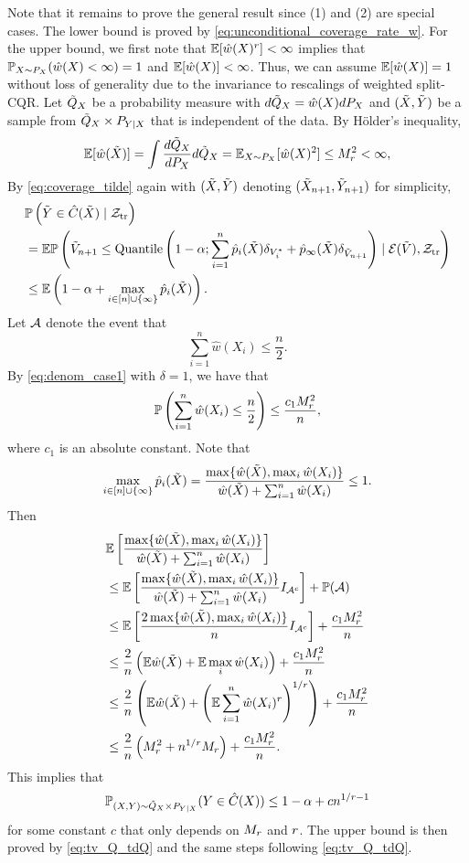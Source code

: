 Note that it remains to prove the general result since (1) and (2) are special cases. The lower bound is proved by \eqref{eq:unconditional_coverage_rate_w}. For the upper bound, we first note that $\E[\hat{w}(X)^{\r}] < \infty$ implies that $\P_{X\sim P_{X}}(\hat{w}(X) < \infty) = 1$ and $\E[\hat{w}(X)] < \infty$. Thus, we can assume $\E[\hat{w}(X)] = 1$ without loss of generality due to the invariance to rescalings of weighted split-CQR. Let $\td{Q}_{X}$ be a probability measure with $d\td{Q}_{X} = \hat{w}(X)dP_{X}$ and $(\td{X}, \td{Y})$ be a sample from $\td{Q}_{X}\times P_{Y\mid X}$ that is independent of the data. By H\"{o}lder's inequality, 
\[\E [\hat{w}(\td{X})] = \int \frac{d\td{Q}_{X}}{dP_{X}}d\td{Q}_{X} = \E_{X\sim P_{X}}[\hat{w}(X)^{2}] \le M_{\r}^2 < \infty,\]
By \eqref{eq:coverage_tilde} again with $(\td{X}, \td{Y})$ denoting $(\td{X}_{n+1}, \td{Y}_{n+1})$ for simplicity,
\begin{align*}
  &\P\lb\td{Y}\in \hat{C}(\td{X})\mid \Z_{\tr}\rb\\
  & = \E \P\lb \td{V}_{n + 1}\le \qt\lb 1 - \alpha; \sum_{i=1}^{n}\hat{p}_{i}(\td{X})\delta_{V_{i}^{*}} + \hat{p}_{\infty}(\td{X})\delta_{\td{V}_{n+1}}\rb \mid \cE(\td{V}), \Z_{\tr}\rb\nonumber\\
 & \le \E \lb 1 - \alpha + \max_{i\in [n]\cup \{\infty\}}\hat{p}_{i}(\td{X})\rb.
\end{align*}
 Let $\A$ denote the event that
 \[\sum_{i=1}^{n}\hat{w}(X_{i}) \le \frac{n}{2}.\]
 By \eqref{eq:denom_case1} with $\delta = 1$, we have that
 \[\P\lb\sum_{i=1}^{n}\hat{w}(X_i)\le \frac{n}{2}\rb \le \frac{c_{1}M_{\r}^{2}}{n},\]
 where $c_1$ is an absolute constant. Note that
 \[\max_{i\in [n]\cup \{\infty\}}\hat{p}_{i}(\td{X}) = \frac{\max\{\hat{w}(\td{X}), \max_{i}\hat{w}(X_{i})\}}{\hat{w}(\td{X}) + \sum_{i=1}^{n}\hat{w}(X_{i})}\le 1.\]
 Then
 \begin{align*}
   &\E \left[\frac{\max\{\hat{w}(\td{X}), \max_{i}\hat{w}(X_{i})\}}{\hat{w}(\td{X}) + \sum_{i=1}^{n}\hat{w}(X_{i})}\right]\\
   & \le \E\left[\frac{\max\{\hat{w}(\td{X}), \max_{i}\hat{w}(X_{i})\}}{\hat{w}(\td{X}) + \sum_{i=1}^{n}\hat{w}(X_{i})}I_{\A^{c}}\right] + \P(\A)\\
   & \le \E\left[\frac{2\max\{\hat{w}(\td{X}), \max_{i}\hat{w}(X_{i})\}}{n}I_{\A^{c}}\right] + \frac{c_{1}M_{\r}^{2}}{n}\\
   & \le \frac{2}{n}\lb \E \hat{w}(\td{X}) + \E \max_{i}\hat{w}(X_{i})\rb + \frac{c_{1}M_{\r}^{2}}{n}\\
   & \le \frac{2}{n}\lb \E \hat{w}(\td{X}) + \lb\E\sum_{i=1}^{n}\hat{w}(X_{i})^{\r}\rb^{1/\r}\rb + \frac{c_{1}M_{\r}^{2}}{n}\\
   & \le \frac{2}{n}\lb M_{\r}^{2} + n^{1 / \r}M_{\r}\rb + \frac{c_{1}M_{\r}^{2}}{n}.
 \end{align*}
This implies that
 \[\P_{(X, Y)\sim \td{Q}_{X}\times P_{Y\mid X}}(Y\in \hat{C}(X))\le 1 - \alpha + cn^{1/\r - 1}\]
 for some constant $c$ that only depends on $M_{\r}$ and $\r$. The upper bound is then proved by \eqref{eq:tv_Q_tdQ} and the same steps following \eqref{eq:tv_Q_tdQ}. 


